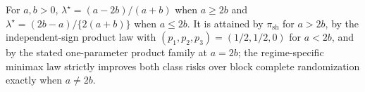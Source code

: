 For \(a,b>0\), \(\lambda^\star=(a-2b)/(a+b)\) when \(a\ge2b\) and \(\lambda^\star=(2b-a)/\{2(a+b)\}\) when \(a\le2b\). It is attained by \(\pi_{\mathrm{sh}}\) for \(a>2b\), by the independent-sign product law with \((p_1,p_2,p_3)=(1/2,1/2,0)\) for \(a<2b\), and by the stated one-parameter product family at \(a=2b\); the regime-specific minimax law strictly improves both class risks over block complete randomization exactly when \(a\ne2b\).